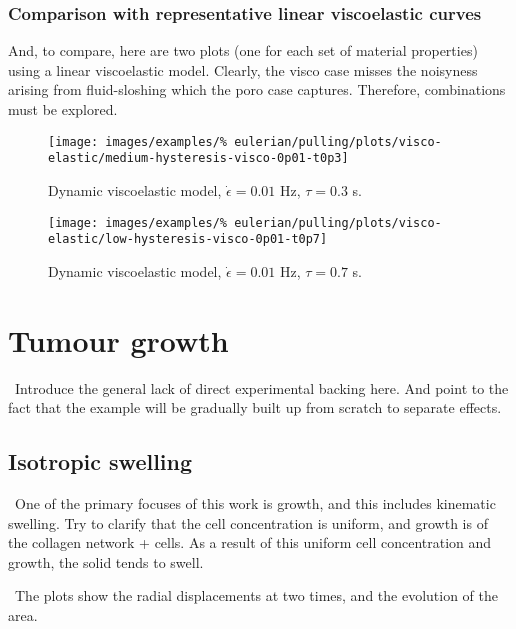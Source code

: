 \subsubsection{Comparison with representative linear viscoelastic
  curves}
\label{viscoelastic-hysteresis}

And, to compare, here are two plots (one for each set of material
properties) using a linear viscoelastic model. Clearly, the visco case
misses the noisyness arising from fluid-sloshing which the poro case
captures. Therefore, combinations must be explored.

\begin{figure}[!hptb]
\centering
\texttt{[image: images/examples/\%
eulerian/pulling/plots/visco-elastic/medium-hysteresis-visco-0p01-t0p3]}
\caption{Dynamic viscoelastic model, $\dot{\epsilon}=0.01$ Hz,
  $\tau=0.3$ s.}
\label{medium-hysteresis-visco-0p01-t0p3}
\end{figure}

\begin{figure}[!hptb]
\centering
\texttt{[image: images/examples/\%
eulerian/pulling/plots/visco-elastic/low-hysteresis-visco-0p01-t0p7]}
\caption{Dynamic viscoelastic model, $\dot{\epsilon}=0.01$ Hz,
  $\tau=0.7$ s.}
\label{low-hysteresis-visco-0p01-t0p7}
\end{figure}

\clearpage

\section{Tumour growth}
\label{tumour-growth}

\textbullet\ Introduce the general lack of direct experimental
backing here. And point to the fact that the example will be gradually
built up from scratch to separate effects.

\subsection{Isotropic swelling}
\label{tumour-isotropic-swelling}

\textbullet\ One of the primary focuses of this work is growth, and this includes
kinematic swelling. Try to clarify that the cell concentration is
uniform, and growth is of the collagen network + cells. As a result of
this uniform cell concentration and growth, the solid tends to swell.

\textbullet\ The plots show the radial displacements at two times, and
the evolution of the area.

